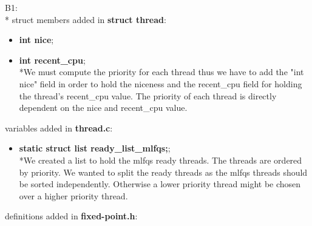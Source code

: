 \documentclass{article}
\begin{document}
B1:\\*
struct members added in \textbf{struct thread}:
\begin{itemize}
\item \textbf{int nice};
\item \textbf{int recent\_cpu};
\\*We must compute the priority for each thread thus we have to add the "int nice" field in order to hold the niceness and the recent\_cpu field for holding the thread's recent\_cpu value. The priority of each thread is directly dependent on the nice and recent\_cpu value.
\end{itemize}
variables added in \textbf{thread.c}:
\begin{itemize}
\item \textbf{static struct list ready\_list\_mlfqs;};
\\*We created a list to hold the mlfqs ready threads. The threads are ordered by priority. We wanted to split the ready threads as the mlfqs threads should be sorted independently. Otherwise a lower priority thread might be chosen over a higher priority thread.
\end{itemize}
definitions added in \textbf{fixed-point.h}:
\end{document}
